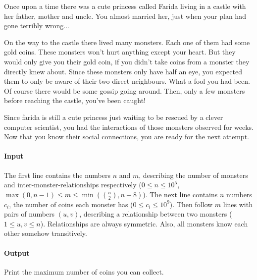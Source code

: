 



\makeheader

Once upon a time there was a cute princess called Farida living in a castle with her father, mother and uncle.
You almost married her, just when your plan had gone terribly wrong...

On the way to the castle there lived many monsters.
Each one of them had some gold coins.
These monsters won't hurt anything except your heart.
But they would only give you their gold coin, if you didn't take coins from a monster they directly knew about.
Since these monsters only have half an eye, you expected them to only be aware of their two direct neighbours.
What a fool you had been.
Of course there would be some gossip going around.
Then, only a few monsters before reaching the castle, you've been caught!

Since farida is still a cute princess just waiting to be rescued by a clever computer scientist, you had the interactions of those monsters observed for weeks.
Now that you know their social connections, you are ready for the next attempt.

\paragraph*{Input}

The first line contains the numbers $n$ and $m$, describing the number of monsters and inter-monster-relationships respectively ($0 \leq n \leq 10^5$, $\max(0, n - 1) \leq m \leq \min(\binom{n}{2}, n + 8)$).
The next line contains $n$ numbers $c_i$, the number of coins each monster has ($0 \leq c_i \leq 10^9$).
Then follow $m$ lines with pairs of numbers $(u, v)$, describing a relationship between two monsters ($1 \leq u, v \leq n$).
Relationships are always symmetric. Also, all monsters know each other somehow transitively.

\paragraph*{Output}

Print the maximum number of coins you can collect.

\begin{samples}
\end{samples}


